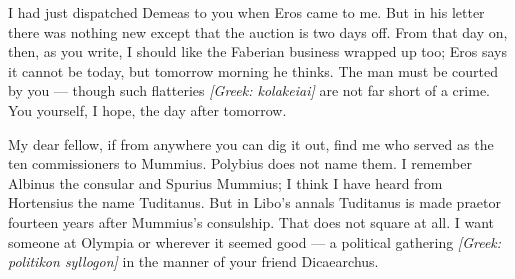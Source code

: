 

 I had just dispatched Demeas to you when Eros came to me. But in his letter there was nothing new except that the auction is two days off. From that day on, then, as you write, I should like the Faberian business wrapped up too; Eros says it cannot be today, but tomorrow morning he thinks. The man must be courted by you --- though such flatteries \textit{[Greek: kolakeiai]} are not far short of a crime. You yourself, I hope, the day after tomorrow.

 My dear fellow, if from anywhere you can dig it out, find me who served as the ten commissioners to Mummius. Polybius does not name them. I remember Albinus the consular and Spurius Mummius; I think I have heard from Hortensius the name Tuditanus. But in Libo's annals Tuditanus is made praetor fourteen years after Mummius's consulship. That does not square at all. I want someone at Olympia or wherever it seemed good --- a political gathering \textit{[Greek: politikon syllogon]} in the manner of your friend Dicaearchus.
